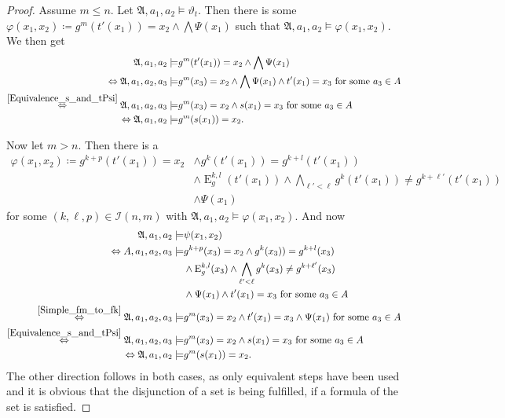 \documentclass[a4paper,11pt,DIV=15]{scrartcl} %
\renewcommand{\phi}{\varphi}
\theoremstyle{plain}
\theoremstyle{definition}
\renewcommand{\theta}{\vartheta}
\begin{document}
\begin{proof}
	Assume $m\leq n$.
	Let $\mathfrak A, a_1,a_2 \models \theta_{t}$.
	Then there is some $\phi(x_1,x_2)\coloneqq g^{m}(t'(x_1))=x_2 \land \bigwedge \Psi(x_1)$ such that $\mathfrak A,a_1,a_2\models \phi(x_1,x_2)$.
	We then get
	\begin{align*}
		\mathfrak A,a_1,a_2 \models & g^{m}(t'(x_1))=x_2 \land \bigwedge \Psi(x_1) \\
		\Leftrightarrow \mathfrak A,a_1,a_2,a_3 \models & g^{m}(x_3)=x_2 \land \bigwedge \Psi(x_1) \land t'(x_1)=x_3 \text{ for some } a_3\in A \\
		\overset{\cref{Equivalence_s_and_tPsi}}{\Leftrightarrow} \mathfrak A,a_1,a_2,a_3\models & g^{m}(x_3)=x_2 \land s(x_1)=x_3 \text{ for some } a_3\in A \\
		\Leftrightarrow \mathfrak A,a_1,a_2 \models & g^{m}(s(x_1))=x_2.
	\end{align*}
	
	Now let $m>n$.
	Then there is a
	\begin{align*}
		\phi(x_1,x_2)\coloneqq g^{k+p}(t'(x_1))=x_2 &\land g^{k}(t'(x_1))=g^{k+l}(t'(x_1)) \\
		& \land \operatorname{E}^{k,l}_g(t'(x_1)) \land \bigwedge_{\ell'<\ell} g^{k}(t'(x_1))\neq g^{k+\ell'}(t'(x_1)) \\
		& \land \Psi(x_1)
	\end{align*}
	for some $(k,\ell,p)\in\mathcal I(n,m)$ with $\mathfrak A,a_1,a_2\models \phi(x_1,x_2)$.
	And now
	\begin{align*}
		\mathfrak A,a_1,a_2 \models & \psi(x_1,x_2) \\
		\Leftrightarrow A,a_1,a_2,a_3 \models &g^{k+p}(x_3)=x_2 \land g^{k}(x_3))=g^{k+l}(x_3) \\
			& \land \operatorname{E}^{k,l}_g(x_3) \land \bigwedge_{\ell'<\ell} g^{k}(x_3)\neq g^{k+\ell'}(x_3) \\
			& \land \Psi(x_1) \land t'(x_1)=x_3 \text{ for some } a_3\in A \\
		\overset{\cref{Simple_fm_to_fk}}{\Leftrightarrow} \mathfrak A, a_1,a_2,a_3 \models & g^{m}(x_3)=x_2 \land t'(x_1)=x_3 \land \Psi(x_1) \text{ for some } a_3 \in A \\
		\overset{\cref{Equivalence_s_and_tPsi}}{\Leftrightarrow} \mathfrak A,a_1,a_2,a_3 \models & g^{m}(x_3)=x_2\land s(x_1)=x_3 \text{ for some } a_3\in A \\
		\Leftrightarrow \mathfrak A,a_1,a_2 \models & g^{m}(s(x_1))=x_2.
	\end{align*}
	The other direction follows in both cases, as only equivalent steps have been used and it is obvious that the disjunction of a set is being fulfilled, if a formula of the set is satisfied.
	

\end{proof}
\end{document}
